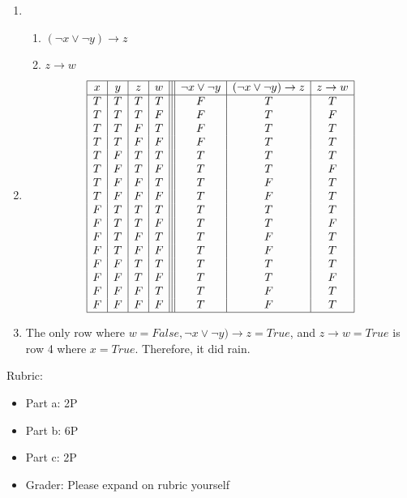 \documentclass{article}
\theoremstyle{definition}
\begin{document}
\begin{solution}
	\begin{enumerate}
	\item 
		\begin{enumerate}
			\item $(\neg x \vee \neg y) \to z$
			\item $z \to w$
		\end{enumerate}
	\item 
	\[\begin{array}{| c | c | c | c | || c | c | c |}
	\hline
	x & y & z & w & \neg x \vee \neg y &(\neg x \vee \neg y) \to z & z \to w\\
	\hline
		T & T & T & T & F & T & T\\
		T & T & T & F & F & T & F\\
		T & T & F & T & F & T & T\\
		T & T & F & F & F & T & T\\
		T & F & T & T & T & T & T\\
		T & F & T & F & T & T & F\\
		T & F & F & T & T & F & T\\
		T & F & F & F & T & F & T\\
		F & T & T & T & T & T & T\\
		F & T & T & F & T & T & F\\
		F & T & F & T & T & F & T\\
		F & T & F & F & T & F & T\\
		F & F & T & T & T & T & T\\
		F & F & T & F & T & T & F\\
		F & F & F & T & T & F & T\\
		F & F & F & F & T & F & T\\
	\hline
	\end{array}\]
	\item The only row where $w=False, \neg x \vee \neg y) \to z=True$, and $z \to w=True$ is row 4 where $x=True$. Therefore, it did rain.
	\end{enumerate}
{\color{red} Rubric:
\begin{itemize}
\item Part a: 2P
\item Part b: 6P
\item Part c: 2P 
\item Grader: Please expand on rubric yourself
\end{itemize}}
\end{solution}
\end{document}
